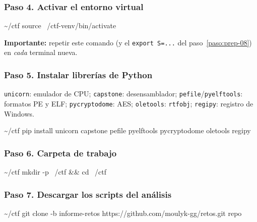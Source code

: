 \documentclass[11pt,a4paper]{article}
\begin{document}
\subsubsection*{Paso 4. Activar el entorno virtual}\label{paso:prep-04}
\begin{comando}{\textasciitilde{}/ctf}
source ~/ctf-venv/bin/activate
\end{comando}
\begin{nota}\textbf{Importante:} repetir este comando (y el \texttt{export S=...} del paso~\ref{paso:prep-08}) en \emph{cada} terminal nueva.\end{nota}

\subsubsection*{Paso 5. Instalar librerías de Python}\label{paso:prep-05}
\texttt{unicorn}: emulador de CPU; \texttt{capstone}: desensamblador; \texttt{pefile}/\texttt{pyelftools}: formatos PE y ELF; \texttt{pycryptodome}: AES; \texttt{oletools}: \texttt{rtfobj}; \texttt{regipy}: registro de Windows.

\begin{comando}{\textasciitilde{}/ctf}
pip install unicorn capstone pefile pyelftools pycryptodome oletools regipy
\end{comando}

\subsubsection*{Paso 6. Carpeta de trabajo}\label{paso:prep-06}
\begin{comando}{\textasciitilde{}/ctf}
mkdir -p ~/ctf && cd ~/ctf
\end{comando}

\subsubsection*{Paso 7. Descargar los scripts del análisis}\label{paso:prep-07}
\begin{comando}{\textasciitilde{}/ctf}
git clone -b informe-retos https://github.com/moulyk-gg/retos.git repo
\end{comando}
\end{document}
